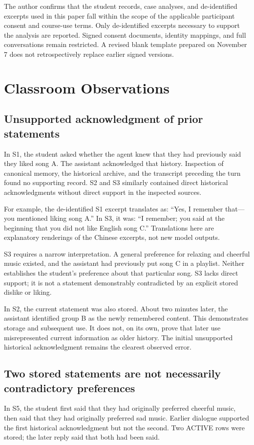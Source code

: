 \documentclass[11pt,a4paper]{article}
\begin{document}
The author confirms that the student records, case analyses, and de-identified excerpts used in this paper fall within the scope of the applicable participant consent and course-use terms. Only de-identified excerpts necessary to support the analysis are reported. Signed consent documents, identity mappings, and full conversations remain restricted. A revised blank template prepared on November 7 does not retrospectively replace earlier signed versions.

\section{Classroom Observations}
\subsection{Unsupported acknowledgment of prior statements}
In S1, the student asked whether the agent knew that they had previously said they liked song A. The assistant acknowledged that history. Inspection of canonical memory, the historical archive, and the transcript preceding the turn found no supporting record. S2 and S3 similarly contained direct historical acknowledgments without direct support in the inspected sources.

For example, the de-identified S1 excerpt translates as: ``Yes, I remember that---you mentioned liking song A.'' In S3, it was: ``I remember; you said at the beginning that you did not like English song C.'' Translations here are explanatory renderings of the Chinese excerpts, not new model outputs.

S3 requires a narrow interpretation. A general preference for relaxing and cheerful music existed, and the assistant had previously put song C in a playlist. Neither establishes the student's preference about that particular song. S3 lacks direct support; it is not a statement demonstrably contradicted by an explicit stored dislike or liking.

In S2, the current statement was also stored. About two minutes later, the assistant identified group B as the newly remembered content. This demonstrates storage and subsequent use. It does not, on its own, prove that later use misrepresented current information as older history. The initial unsupported historical acknowledgment remains the clearest observed error.

\subsection{Two stored statements are not necessarily contradictory preferences}
In S5, the student first said that they had originally preferred cheerful music, then said that they had originally preferred sad music. Earlier dialogue supported the first historical acknowledgment but not the second. Two ACTIVE rows were stored; the later reply said that both had been said.
\end{document}

